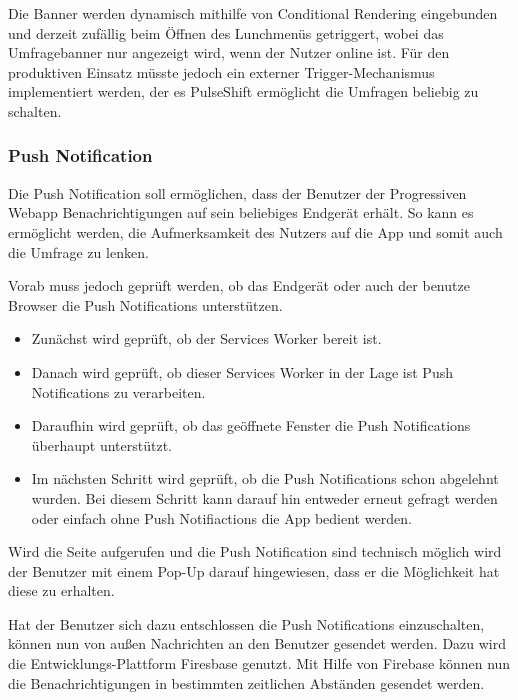 Die Banner werden dynamisch mithilfe von Conditional Rendering eingebunden und derzeit zufällig beim Öffnen des Lunchmenüs getriggert, wobei das Umfragebanner nur angezeigt wird, wenn der Nutzer online ist. Für den produktiven Einsatz müsste jedoch ein externer Trigger-Mechanismus implementiert werden, der es PulseShift ermöglicht die Umfragen beliebig zu schalten.



\subsubsection{Push Notification}
Die Push Notification soll ermöglichen, dass der Benutzer der Progressiven Webapp Benachrichtigungen auf sein beliebiges Endgerät erhält. So kann es ermöglicht werden, die Aufmerksamkeit des Nutzers auf die App und somit auch die Umfrage zu lenken. 

Vorab muss jedoch geprüft werden, ob das Endgerät oder auch der benutze Browser die Push Notifications unterstützen. 

\begin{itemize}
\item Zunächst wird geprüft, ob der Services Worker bereit ist. 
\item Danach wird geprüft, ob dieser Services Worker in der Lage ist Push Notifications zu verarbeiten.
\item Daraufhin wird geprüft, ob das geöffnete Fenster die Push Notifications überhaupt unterstützt.
\item Im nächsten Schritt wird geprüft, ob die Push Notifications schon abgelehnt wurden. Bei diesem Schritt kann darauf hin entweder erneut gefragt werden oder einfach ohne Push Notifiactions die App bedient werden.
\end{itemize} 

Wird die Seite aufgerufen und die Push Notification sind technisch möglich wird der Benutzer mit einem Pop-Up darauf hingewiesen, dass er die Möglichkeit hat diese zu erhalten. 

Hat der Benutzer sich dazu entschlossen die Push Notifications einzuschalten, können nun von außen Nachrichten an den Benutzer gesendet werden. Dazu wird die Entwicklungs-Plattform Firesbase genutzt. Mit Hilfe von Firebase können nun die Benachrichtigungen in bestimmten zeitlichen Abständen gesendet werden.

